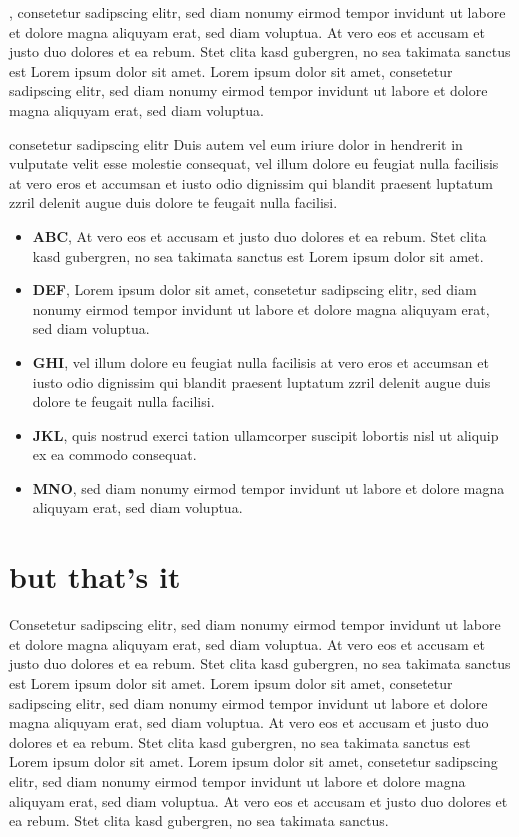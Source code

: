 \documentclass[10pt,twoside,twocolumn,openany,nodeprecatedcode]{dndbook}
\begin{document}
, consetetur sadipscing elitr, sed diam nonumy eirmod tempor invidunt ut labore et dolore magna aliquyam erat, sed diam voluptua. At vero eos et accusam et justo duo dolores et ea rebum. Stet clita kasd gubergren, no sea takimata sanctus est Lorem ipsum dolor sit amet. Lorem ipsum dolor sit amet, consetetur sadipscing elitr, sed diam nonumy eirmod tempor invidunt ut labore et dolore magna aliquyam erat, sed diam voluptua.

\begin{DndComment}{consetetur sadipscing elitr}
Duis autem vel eum iriure dolor in hendrerit in vulputate velit esse molestie consequat, vel illum dolore eu feugiat nulla facilisis at vero eros et accumsan et iusto odio dignissim qui blandit praesent luptatum zzril delenit augue duis dolore te feugait nulla facilisi.

\begin{itemize}

\item \textbf{ABC}, At vero eos et accusam et justo duo dolores et ea rebum. Stet clita kasd gubergren, no sea takimata sanctus est Lorem ipsum dolor sit amet. 
\item \textbf{DEF}, Lorem ipsum dolor sit amet, consetetur sadipscing elitr, sed diam nonumy eirmod tempor invidunt ut labore et dolore magna aliquyam erat, sed diam voluptua.
\item \textbf{GHI}, vel illum dolore eu feugiat nulla facilisis at vero eros et accumsan et iusto odio dignissim qui blandit praesent luptatum zzril delenit augue duis dolore te feugait nulla facilisi.
\item \textbf{JKL}, quis nostrud exerci tation ullamcorper suscipit lobortis nisl ut aliquip ex ea commodo consequat.
\item \textbf{MNO}, sed diam nonumy eirmod tempor invidunt ut labore et dolore magna aliquyam erat, sed diam voluptua.
\end{itemize}


\end{DndComment}

\section{but that's it}

Consetetur sadipscing elitr, sed diam nonumy eirmod tempor invidunt ut labore et dolore magna aliquyam erat, sed diam voluptua. At vero eos et accusam et justo duo dolores et ea rebum. Stet clita kasd gubergren, no sea takimata sanctus est Lorem ipsum dolor sit amet. Lorem ipsum dolor sit amet, consetetur sadipscing elitr, sed diam nonumy eirmod tempor invidunt ut labore et dolore magna aliquyam erat, sed diam voluptua. At vero eos et accusam et justo duo dolores et ea rebum. Stet clita kasd gubergren, no sea takimata sanctus est Lorem ipsum dolor sit amet. Lorem ipsum dolor sit amet, consetetur sadipscing elitr, sed diam nonumy eirmod tempor invidunt ut labore et dolore magna aliquyam erat, sed diam voluptua. At vero eos et accusam et justo duo dolores et ea rebum. Stet clita kasd gubergren, no sea takimata sanctus.
\end{document}
